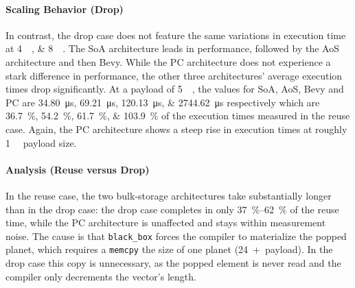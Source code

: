 \paragraph{Scaling Behavior (Drop)}
In contrast, the drop case does not feature the same variations in execution time at \qtylist{4;8}{\kilo\byte}. The \ac{SoA} architecture leads in performance, followed by the \ac{AoS} architecture and then Bevy. While the \ac{PC} architecture does not experience a stark difference in performance, the other three architectures' average execution times drop significantly. At a payload of \qty{5}{\kilo\byte}, the values for \ac{SoA}, \ac{AoS}, Bevy and \ac{PC} are \qtylist{34.80;69.21;120.13;2744.62}{\micro\second} respectively which are \qtylist{36.7;54.2;61.7;103.9}{\percent} of the execution times measured in the reuse case. Again, the \ac{PC} architecture shows a steep rise in execution times at roughly \qty{1}{\kilo\byte} payload size. 

\paragraph{Analysis (Reuse versus Drop)}
In the reuse case, the two bulk-storage architectures take substantially longer than in the drop case: the drop case completes in only \qtyrange{37}{62}{\percent} of the reuse time, while the \ac{PC} architecture is unaffected and stays within measurement noise. The cause is that \texttt{black\_box} forces the compiler to materialize the popped planet, which requires a \texttt{memcpy} the size of one planet (\qty{24}{\byte}~+~payload). In the drop case this copy is unnecessary, as the popped element is never read and the compiler only decrements the vector's length.

